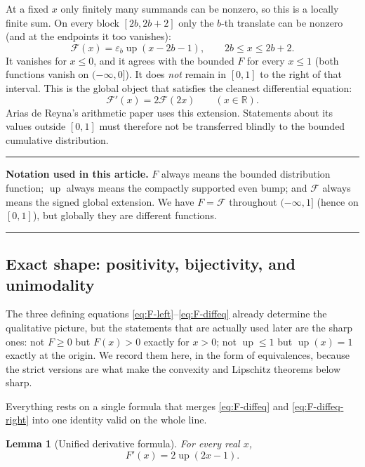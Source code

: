 \documentclass[11pt,oneside]{article}
\newtheorem{lemma}[theorem]{Lemma}
\theoremstyle{definition}
\theoremstyle{remark}
\newcommand{\R}{\mathbb R}
\newcommand{\Up}{\operatorname{up}}
\newenvironment{boxedremark}{%
  \par\smallskip\noindent\begin{center}\begin{minipage}{0.94\textwidth}%
  \color{black}\hrule\vspace{0.6em}\small
}{%
  \vspace{0.6em}\hrule\end{minipage}\end{center}\smallskip
}
\begin{document}
At a fixed $x$ only finitely many summands can be nonzero, so this is a locally finite sum.
On every block $[2b,2b+2]$ only the $b$-th translate can be nonzero
(and at the endpoints it too vanishes):
\begin{equation}
 \mathcal F(x)=\varepsilon_b\Up(x-2b-1),
 \qquad 2b\le x\le 2b+2.                                  \label{eq:single-block}
\end{equation}
It vanishes for $x\le0$, and it agrees with the bounded $F$ for every $x\le1$
(both functions vanish on $(-\infty,0]$).  It does
\emph{not} remain in $[0,1]$ to the right of that interval.  This is the global object that
satisfies the cleanest differential equation:
\begin{equation}
 \mathcal F'(x)=2\mathcal F(2x)\qquad(x\in\R).             \label{eq:global-diffeq}
\end{equation}
Arias de Reyna's arithmetic paper uses this extension.  Statements about its values outside
$[0,1]$ must therefore not be transferred blindly to the bounded cumulative distribution.

\begin{boxedremark}
\textbf{Notation used in this article.}
$F$ always means the bounded distribution function; $\Up$ always means the compactly
supported even bump; and $\mathcal F$ always means the signed global extension.  We have
$F=\mathcal F$ throughout $(-\infty,1]$ (hence on $[0,1]$), but globally they are different
functions.
\end{boxedremark}

\subsection{Exact shape: positivity, bijectivity, and unimodality}
\label{shape:basic}

The three defining equations \eqref{eq:F-left}--\eqref{eq:F-diffeq} already determine the
qualitative picture, but the statements that are actually used later are the sharp ones: not
$F\ge0$ but $F(x)>0$ exactly for $x>0$; not $\Up\le1$ but $\Up(x)=1$ exactly at the origin.
We record them here, in the form of equivalences, because the strict versions are what make
the convexity and Lipschitz theorems below sharp.

Everything rests on a single formula that merges \eqref{eq:F-diffeq} and
\eqref{eq:F-diffeq-right} into one identity valid on the whole line.

\begin{lemma}[Unified derivative formula]
\label{thm:shape-unified-derivative}
For every real $x$,
\begin{equation}
 F'(x)=2\Up(2x-1).                                        \label{eq:shape-unified-derivative}
\end{equation}
\end{lemma}
\end{document}
